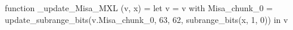 function _update_Misa_MXL (v, x) = let v = { v with Misa_chunk_0 = update_subrange_bits(v.Misa_chunk_0, 63, 62, subrange_bits(x, 1, 0)) } in
  v
